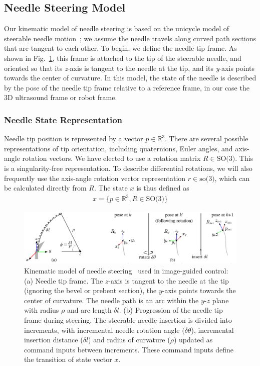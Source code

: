 \subsection{Needle Steering Model}
Our kinematic model of needle steering is based on the unicycle model of steerable needle motion~\cite{Webster2006,Park2005}; we assume the needle travels along curved path sections that are tangent to each other. To begin, we define the needle tip frame. As shown in Fig.~\ref{fig:NeedleKinematics}, this frame is attached to the tip of the steerable needle, and oriented so that its \textit{z}-axis is tangent to the needle at the tip, and its \textit{y}-axis points towards the center of curvature. In this model, the state of the needle is described by the pose of the needle tip frame relative to a reference frame, in our case the 3D ultrasound frame or robot frame. 

\subsubsection{Needle State Representation}
Needle tip position is represented by a vector ${p} \in \mathbb{R}^3$. There are several possible representations of tip orientation, including quaternions, Euler angles, and axis-angle rotation vectors. We have elected to use a rotation matrix ${R} \in \textrm{SO(3)}$. This is a singularity-free representation. To describe differential rotations, we will also frequently use the axis-angle rotation vector representation $r \in \textrm{so(3)}$, which can be calculated directly from ${R}$. The state ${x}$ is thus defined as
\begin{align}
{x} = \{p \in \mathbb{R}^3, R \in \textrm{SO(3)}\}
\end{align}

\begin{figure}[!t]
\centering
\includegraphics[width=\textwidth]{Images/Chapter4/NeedleKinematics/NeedleKinematics}%
\caption[Kinematic model of needle steering]{Kinematic model of needle steering~\cite{Webster2006} used in image-guided control: (a) Needle tip frame. The $z$-axis is tangent to the needle at the tip (ignoring the bevel or prebent section), the $y$-axis points towards the center of curvature. The needle path is an arc within the $y$-$z$ plane with radius $\rho$ and arc length $\delta l$. (b) Progression of the needle tip frame during steering. The steerable needle insertion is divided into increments, with incremental needle rotation angle ($\delta\theta$), incremental insertion distance ($\delta l$) and radius of curvature ($\rho$) updated as command inputs between increments. These command inputs define the transition of state vector ${x}$.}
\label{fig:NeedleKinematics}
\end{figure}

